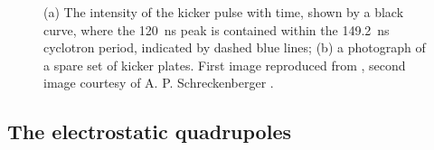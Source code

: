 \begin{figure}[t!]
\centering{}

{}
\caption{(a) The intensity of the kicker pulse with time, shown by a black curve, where the \SI{120}{\nano\second} peak is contained within the \SI{149.2}{\nano\second} cyclotron period, indicated by dashed blue lines; (b) a photograph of a spare set of kicker plates. First image reproduced from \cite{BeamDynamics}, second image courtesy of A. P. Schreckenberger \cite{KickerPlates}.}
\label{fig:Kickers}
\end{figure} 


\subsection{The electrostatic quadrupoles}\label{sec:ESQs}


